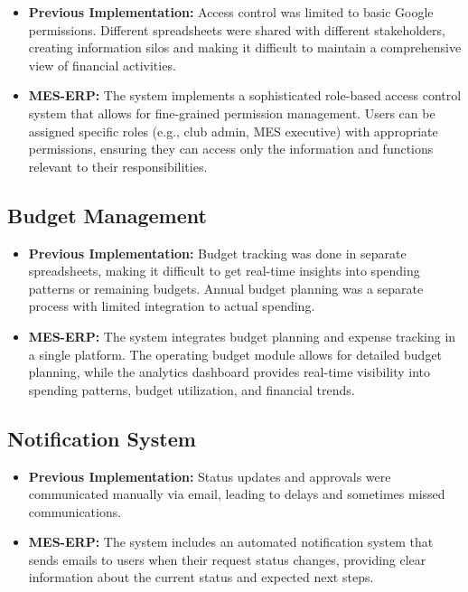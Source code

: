 \documentclass[12pt, titlepage]{article}
\begin{document}
\begin{itemize}
    \item \textbf{Previous Implementation:} Access control was limited to basic Google permissions. Different spreadsheets were shared with different stakeholders, creating information silos and making it difficult to maintain a comprehensive view of financial activities.
    
    \item \textbf{MES-ERP:} The system implements a sophisticated role-based access control system that allows for fine-grained permission management. Users can be assigned specific roles (e.g., club admin, MES executive) with appropriate permissions, ensuring they can access only the information and functions relevant to their responsibilities.
\end{itemize}

\subsection{Budget Management}

\begin{itemize}
    \item \textbf{Previous Implementation:} Budget tracking was done in separate spreadsheets, making it difficult to get real-time insights into spending patterns or remaining budgets. Annual budget planning was a separate process with limited integration to actual spending.
    
    \item \textbf{MES-ERP:} The system integrates budget planning and expense tracking in a single platform. The operating budget module allows for detailed budget planning, while the analytics dashboard provides real-time visibility into spending patterns, budget utilization, and financial trends.
\end{itemize}

\subsection{Notification System}

\begin{itemize}
    \item \textbf{Previous Implementation:} Status updates and approvals were communicated manually via email, leading to delays and sometimes missed communications.
    
    \item \textbf{MES-ERP:} The system includes an automated notification system that sends emails to users when their request status changes, providing clear information about the current status and expected next steps.
\end{itemize}
\end{document}
